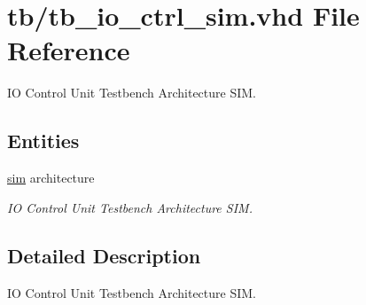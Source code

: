 \hypertarget{tb__io__ctrl__sim_8vhd}{}\section{tb/tb\+\_\+io\+\_\+ctrl\+\_\+sim.vhd File Reference}
\label{tb__io__ctrl__sim_8vhd}


IO Control Unit Testbench Architecture S\+IM.  


\subsection*{Entities}
\begin{DoxyCompactItemize}
\item 
\hyperlink{classtb__io__ctrl_1_1sim}{sim} architecture
\begin{DoxyCompactList}\small\item\em IO Control Unit Testbench Architecture S\+IM. \end{DoxyCompactList}\end{DoxyCompactItemize}


\subsection{Detailed Description}
IO Control Unit Testbench Architecture S\+IM. 

